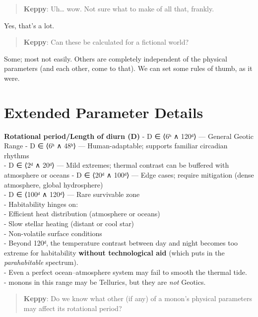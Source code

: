 \documentclass[
  letterpaper,
]{book}
\begin{document}
\begin{quote}
\textbf{Keppy}: Uh\ldots{} wow. Not sure what to make of all that,
frankly.
\end{quote}

Yes, that's a lot.

\begin{quote}
\textbf{Keppy}: Can these be calculated for a fictional world?
\end{quote}

Some; most not easily. Others are completely independent of the physical
parameters (and each other, come to that). We can set some rules of
thumb, as it were.

\section{Extended Parameter Details}\label{extended-parameter-details}

\textbf{Rotational period/Length of diurn (D)} - D ∈ ⟨6ʰ ∧ 120ᵈ⟩ ---
General Geotic Range - D ∈ ⟨6ʰ ∧ 48ʰ⟩ --- Human-adaptable; supports
familiar circadian rhythms\\
- D ∈ ⟨2ᵈ ∧ 20ᵈ⟩ --- Mild extremes; thermal contrast can be buffered
with atmosphere or oceans - D ∈ ⟨20ᵈ ∧ 100ᵈ⟩ --- Edge cases; require
mitigation (dense atmosphere, global hydrosphere)\\
- D ∈ ⟨100ᵈ ∧ 120ᵈ⟩ --- Rare survivable zone\\
- Habitability hinges on:\\
- Efficient heat distribution (atmosphere or oceans)\\
- Slow stellar heating (distant or cool star)\\
- Non-volatile surface conditions\\
- Beyond 120ᵈ, the temperature contrast between day and night becomes
too extreme for habitability \textbf{without technological aid} (which
puts in the \emph{parahabitable} spectrum).\\
- Even a perfect ocean--atmosphere system may fail to smooth the thermal
tide.\\
- monons in this range may be Tellurics, but they are \emph{not}
Geotics.

\begin{quote}
\textbf{Keppy}: Do we know what other (if any) of a monon's physical
parameters may affect its rotational period?
\end{quote}
\end{document}

